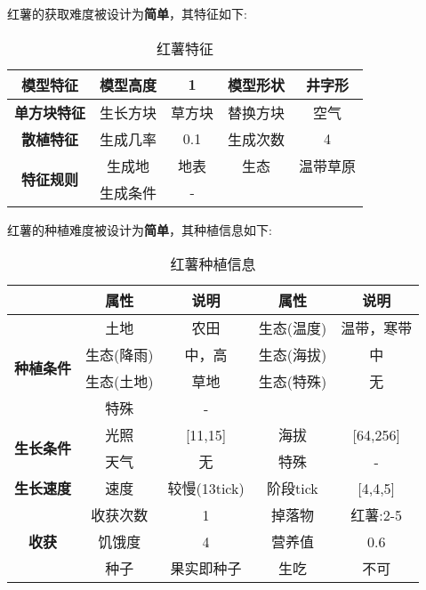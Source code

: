 红薯的获取难度被设计为\textbf{简单}，其特征如下:
\begin{table}[H]
    \centering
    \caption{红薯特征}
    \label{table:红薯特征}
    \setlength{\tabcolsep}{4mm}
    \begin{tabular}{c|cc|cc}
        \toprule
        \textbf{模型特征}                  & 模型高度 & 1      & 模型形状 & 井字形 \\
        \midrule
        \textbf{单方块特征}                & 生长方块 & 草方块 & 替换方块 & 空气   \\
        \midrule
        \textbf{散植特征}                  & 生成几率 & 0.1    & 生成次数 & 4      \\
        \midrule
        \multirow{2}{*}{\textbf{特征规则}} & 生成地   & 地表   & 生态     & 温带草原   \\
                                           & 生成条件 & -              \\
        \bottomrule
    \end{tabular}
\end{table}


红薯的种植难度被设计为\textbf{简单}，其种植信息如下:

\begin{table}[H]
    \centering
    \caption{红薯种植信息}
    \label{table:红薯种植信息}
    \setlength{\tabcolsep}{4mm}
    \begin{tabular}{c|cc|cc}
        \toprule
                                           & \textbf{属性} & \textbf{说明}   & \textbf{属性} & \textbf{说明} \\
        \midrule
        \multirow{4}{*}{\textbf{种植条件}} & 土地          & 农田            & 生态(温度)    & 温带，寒带    \\
                                           & 生态(降雨)    & 中，高          & 生态(海拔)    & 中            \\
                                           & 生态(土地)    & 草地            & 生态(特殊)    & 无            \\
                                           & 特殊          & -                                 \\
        \midrule
        \multirow{2}{*}{\textbf{生长条件}} & 光照          & [11,15]         & 海拔          & [64,256]      \\
                                           & 天气          & 无              & 特殊          & -      \\
        \midrule
        \textbf{生长速度}                  & 速度          & 较慢(13tick)       & 阶段tick      & [4,4,5]       \\
        \midrule
        \multirow{3}{*}{\textbf{收获}}     & 收获次数      & 1               & 掉落物        & 红薯:2-5      \\
                                           & 饥饿度        & 4               & 营养值        & 0.6           \\
                                           & 种子          & 果实即种子        & 生吃          & 不可       \\
        \bottomrule
    \end{tabular}
\end{table}

